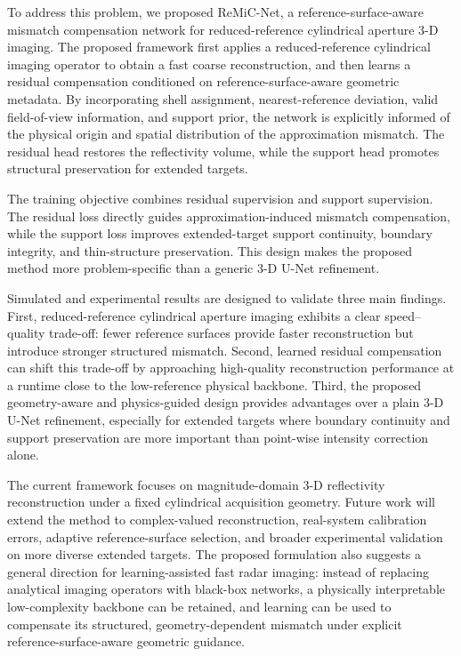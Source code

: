 \documentclass[journal]{IEEEtran}
\begin{document}
To address this problem, we proposed ReMiC-Net, a reference-surface-aware mismatch compensation network for reduced-reference cylindrical aperture 3-D imaging. The proposed framework first applies a reduced-reference cylindrical imaging operator to obtain a fast coarse reconstruction, and then learns a residual compensation conditioned on reference-surface-aware geometric metadata. By incorporating shell assignment, nearest-reference deviation, valid field-of-view information, and support prior, the network is explicitly informed of the physical origin and spatial distribution of the approximation mismatch. The residual head restores the reflectivity volume, while the support head promotes structural preservation for extended targets.

The training objective combines residual supervision and support supervision. The residual loss directly guides approximation-induced mismatch compensation, while the support loss improves extended-target support continuity, boundary integrity, and thin-structure preservation. This design makes the proposed method more problem-specific than a generic 3-D U-Net refinement.

Simulated and experimental results are designed to validate three main findings. First, reduced-reference cylindrical aperture imaging exhibits a clear speed--quality trade-off: fewer reference surfaces provide faster reconstruction but introduce stronger structured mismatch. Second, learned residual compensation can shift this trade-off by approaching high-quality reconstruction performance at a runtime close to the low-reference physical backbone. Third, the proposed geometry-aware and physics-guided design provides advantages over a plain 3-D U-Net refinement, especially for extended targets where boundary continuity and support preservation are more important than point-wise intensity correction alone.

The current framework focuses on magnitude-domain 3-D reflectivity reconstruction under a fixed cylindrical acquisition geometry. Future work will extend the method to complex-valued reconstruction, real-system calibration errors, adaptive reference-surface selection, and broader experimental validation on more diverse extended targets. The proposed formulation also suggests a general direction for learning-assisted fast radar imaging: instead of replacing analytical imaging operators with black-box networks, a physically interpretable low-complexity backbone can be retained, and learning can be used to compensate its structured, geometry-dependent mismatch under explicit reference-surface-aware geometric guidance.



\end{document}
